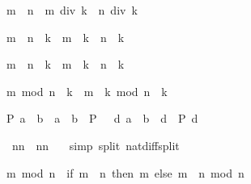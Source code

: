 \begin{isabellebody}
\begin{isamarkuptext}
\begin{isabelle}%
m\ {\isasymle}\ n\ {\isasymLongrightarrow}\ m\ div\ k\ {\isasymle}\ n\ div\ k%
\end{isabelle}

\begin{isabelle}%
{\isacharparenleft}m\ {\isacharplus}\ n{\isacharparenright}\ {\isacharasterisk}\ k\ {\isacharequal}\ m\ {\isacharasterisk}\ k\ {\isacharplus}\ n\ {\isacharasterisk}\ k%
\end{isabelle}

\begin{isabelle}%
{\isacharparenleft}m\ {\isacharminus}\ n{\isacharparenright}\ {\isacharasterisk}\ k\ {\isacharequal}\ m\ {\isacharasterisk}\ k\ {\isacharminus}\ n\ {\isacharasterisk}\ k%
\end{isabelle}

\begin{isabelle}%
m\ mod\ n\ {\isacharasterisk}\ k\ {\isacharequal}\ m\ {\isacharasterisk}\ k\ mod\ {\isacharparenleft}n\ {\isacharasterisk}\ k{\isacharparenright}%
\end{isabelle}

\begin{isabelle}%
P\ {\isacharparenleft}a\ {\isacharminus}\ b{\isacharparenright}\ {\isacharequal}\ {\isacharparenleft}{\isacharparenleft}a\ {\isacharless}\ b\ {\isasymlongrightarrow}\ P\ {}{\isacharparenright}\ {\isasymand}\ {\isacharparenleft}{\isasymforall}d{\isachardot}\ a\ {\isacharequal}\ b\ {\isacharplus}\ d\ {\isasymlongrightarrow}\ P\ d{\isacharparenright}{\isacharparenright}%
\end{isabelle}
%
\end{isamarkuptext}%
\ {\isachardoublequote}{\isacharparenleft}n{\isacharminus}{}{\isacharparenright}{\isacharasterisk}{\isacharparenleft}n{\isacharplus}{}{\isacharparenright}\ {\isacharequal}\ n{\isacharasterisk}n\ {\isacharminus}\ {}{\isachardoublequote}\isanewline
{}\ {\isacharparenleft}simp\ split{\isacharcolon}\ nat{\isacharunderscore}diff{\isacharunderscore}split{\isacharparenright}\isanewline
{}%
\begin{isamarkuptext}%
\begin{isabelle}%
m\ mod\ n\ {\isacharequal}\ {\isacharparenleft}if\ m\ {\isacharless}\ n\ then\ m\ else\ {\isacharparenleft}m\ {\isacharminus}\ n{\isacharparenright}\ mod\ n{\isacharparenright}%
\end{isabelle}


\end{isamarkuptext}
\end{isabellebody}
